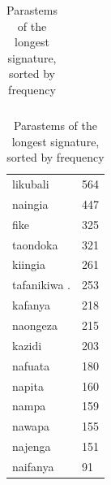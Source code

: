 \documentclass[output=paper,colorlinks,citecolor=brown,
]{langscibook}
\begin{document}
\begin{table}
\begin{minipage}{.3\textwidth}
\begin{tabular}{ll}
\end{tabular}
\end{minipage}
\begin{minipage}{.35\textwidth}
\begin{tabular}{ll}
{li}{kubali}     & 564 \\ 
{na}{ingi}a    & 447 \\ 
{fik}e & 325 \\ 
{ta}{ondok}a & 321 \\   
{ki}{ingi}a   & 261 \\ 
{ta}{fanikiw}a .  & 253  \\ 
{ka}{fany}a   & 218 \\ 
{na}{ongez}a   & 215 \\ 
{ka}{zidi}     & 203 \\ 
{na}{fuat}a  & 180 \\ 
{na}{pit}a    & 160 \\ 
{na}m{p}a    & 159 \\ 
{na}wa{p}a    & 155 \\ 
{na}{jeng}a    & 151 \\ 
{na}i{fany}a    &91 \\ 

\end{tabular}
\end{minipage}
\lspbottomrule
\caption{Parastems of the longest signature, sorted by frequency}
\label{topsigstems}
\end{table}
%
%
\end{document}
